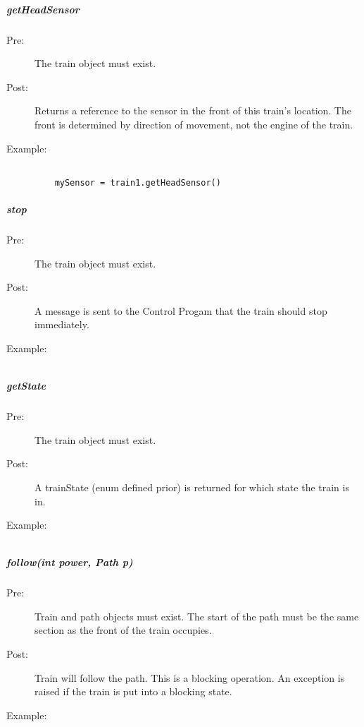 \documentclass[a4paper,11pt,notitlepage]{article}
\def\CS{Control Progam\xspace}
\begin{document}
\subparagraph{getHeadSensor} 
\begin{description}
\item[\hspace{1cm}Pre:] The train object must exist. 
\item[\hspace{1cm}Post:] Returns a reference to the sensor in the front of this train's location. The front is determined by direction of movement, not the engine of the train.
\item[\hspace{1cm}Example:]
\begin{verbatim}

    mySensor = train1.getHeadSensor()
\end{verbatim}
\end{description}

\subparagraph{stop} 
\begin{description}
\item[\hspace{1cm}Pre:] The train object must exist. 
\item[\hspace{1cm}Post:] A message is sent to the \CS that the train should stop immediately.
\item[\hspace{1cm}Example:]
\begin{verbatim}

\end{verbatim}
\end{description}

\subparagraph{getState} 
\begin{description}
\item[\hspace{1cm}Pre:] The train object must exist. 
\item[\hspace{1cm}Post:] A trainState (enum defined prior) is returned for which state the train is in.
\item[\hspace{1cm}Example:]
\begin{verbatim}

\end{verbatim}
\end{description}

\subparagraph{follow(int power, Path p)} 
\begin{description}
\item[\hspace{1cm}Pre:] Train and path objects must exist. The start of the path must be the same section as the front of the train occupies. 
\item[\hspace{1cm}Post:] Train will follow the path. This is a blocking operation. An exception is raised if the train is put into a blocking state.
\item[\hspace{1cm}Example:]
\begin{verbatim}

\end{verbatim}
\end{description}
\end{document}
